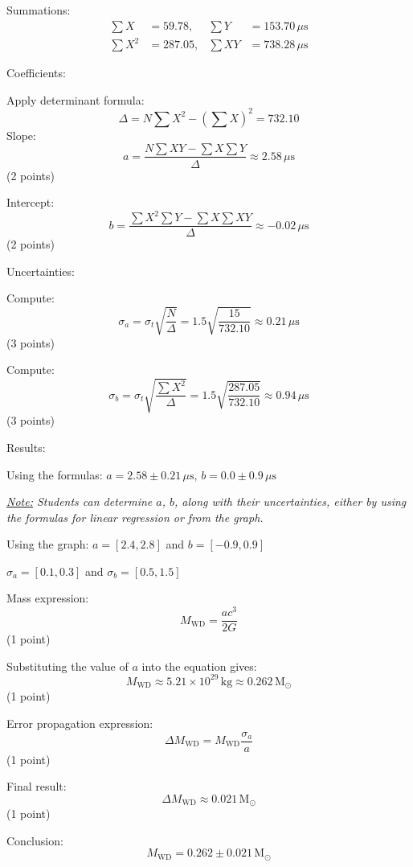 \begin{description}
  Summations:
  \begin{align*}
  \sum X &= 59.78, & \sum Y &= 153.70\,\mu\mathrm{s} \\
  \sum X^2 &= 287.05, & \sum XY &= 738.28\,\mu\mathrm{s}
  \end{align*}

  Coefficients:

  Apply determinant formula:
  \[
  \Delta = N\sum X^2 - \left(\sum X\right)^2 = 732.10
  \]
  Slope:
  \[
  a = \frac{N\sum XY - \sum X \sum Y}{\Delta} \approx 2.58\,\mu\mathrm{s}
  \]
  \hfill(2 points)

  Intercept:
  \[
  b = \frac{\sum X^2 \sum Y - \sum X \sum XY}{\Delta} \approx -0.02\,\mu\mathrm{s}
  \]
  \hfill(2 points)

  Uncertainties:

  Compute:
  \[
  \sigma_a = \sigma_t\sqrt{\frac{N}{\Delta}}
    = 1.5\sqrt{\frac{15}{732.10}} \approx 0.21\,\mu\mathrm{s}
  \]
  \hfill(3 points)

  Compute:
  \[
  \sigma_b = \sigma_t\sqrt{\frac{\sum X^2}{\Delta}}
    = 1.5\sqrt{\frac{287.05}{732.10}} \approx 0.94\,\mu\mathrm{s}
  \]
  \hfill(3 points)

  Results:

  Using the formulas: $a = 2.58 \pm 0.21\,\mu\mathrm{s}$,
  $b = 0.0 \pm 0.9\,\mu\mathrm{s}$

  \emph{\underline{Note:} Students can determine $a$, $b$, along with their
  uncertainties, either by using the formulas for linear regression or from
  the graph.}

  Using the graph: $a = [2.4, 2.8]$ and $b = [-0.9, 0.9]$

  \hspace*{2em}$\sigma_a = [0.1, 0.3]$ and $\sigma_b = [0.5, 1.5]$

\item[(c)] Mass expression:
  \[
  M_{\mathrm{WD}} = \frac{ac^3}{2G}
  \]
  \hfill(1 point)

  Substituting the value of $a$ into the equation gives:
  \[
  M_{\mathrm{WD}} \approx 5.21 \times 10^{29}\,\mathrm{kg}
    \approx 0.262\,\mathrm{M}_\odot
  \]
  \hfill(1 point)

  Error propagation expression:
  \[
  \Delta M_{\mathrm{WD}} = M_{\mathrm{WD}}\frac{\sigma_a}{a}
  \]
  \hfill(1 point)

  Final result:
  \[
  \Delta M_{\mathrm{WD}} \approx 0.021\,\mathrm{M}_\odot
  \]
  \hfill(1 point)

  Conclusion:
  \[
  M_{\mathrm{WD}} = 0.262 \pm 0.021\,\mathrm{M}_\odot
  \]
\end{description}

